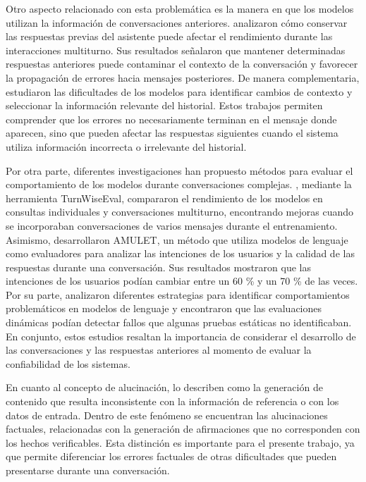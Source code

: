 \documentclass[manuscrito,spanish]{rcc}
\begin{document}
Otro aspecto relacionado con esta problemática es la manera en que los modelos utilizan la información de conversaciones anteriores. \citet{huang2026} analizaron cómo conservar las respuestas previas del asistente puede afectar el rendimiento durante las interacciones multiturno. Sus resultados señalaron que mantener determinadas respuestas anteriores puede contaminar el contexto de la conversación y favorecer la propagación de errores hacia mensajes posteriores. De manera complementaria, \citet{sinha2026} estudiaron las dificultades de los modelos para identificar cambios de contexto y seleccionar la información relevante del historial. Estos trabajos permiten comprender que los errores no necesariamente terminan en el mensaje donde aparecen, sino que pueden afectar las respuestas siguientes cuando el sistema utiliza información incorrecta o irrelevante del historial.

Por otra parte, diferentes investigaciones han propuesto métodos para evaluar el comportamiento de los modelos durante conversaciones complejas. \citet{graf2026}, mediante la herramienta TurnWiseEval, compararon el rendimiento de los modelos en consultas individuales y conversaciones multiturno, encontrando mejoras cuando se incorporaban conversaciones de varios mensajes durante el entrenamiento. Asimismo, \citet{ramnath2025} desarrollaron AMULET, un método que utiliza modelos de lenguaje como evaluadores para analizar las intenciones de los usuarios y la calidad de las respuestas durante una conversación. Sus resultados mostraron que las intenciones de los usuarios podían cambiar entre un 60 \% y un 70 \% de las veces. Por su parte, \citet{huang2026} analizaron diferentes estrategias para identificar comportamientos problemáticos en modelos de lenguaje y encontraron que las evaluaciones dinámicas podían detectar fallos que algunas pruebas estáticas no identificaban. En conjunto, estos estudios resaltan la importancia de considerar el desarrollo de las conversaciones y las respuestas anteriores al momento de evaluar la confiabilidad de los sistemas.

En cuanto al concepto de alucinación, \citet{ji2023} lo describen como la generación de contenido que resulta inconsistente con la información de referencia o con los datos de entrada. Dentro de este fenómeno se encuentran las alucinaciones factuales, relacionadas con la generación de afirmaciones que no corresponden con los hechos verificables. Esta distinción es importante para el presente trabajo, ya que permite diferenciar los errores factuales de otras dificultades que pueden presentarse durante una conversación.
\end{document}
